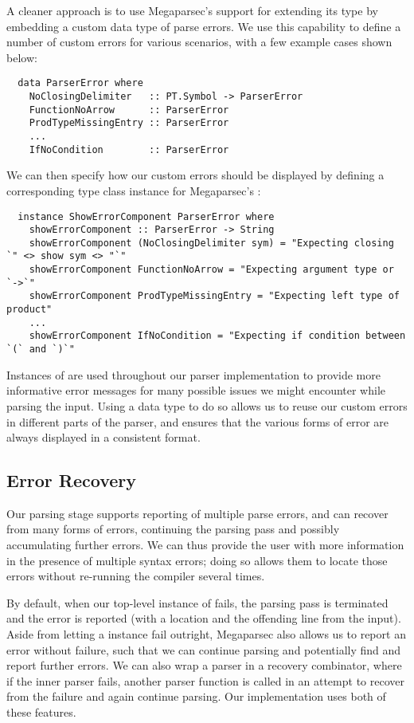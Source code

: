 A cleaner approach is to use Megaparsec's support for extending its
 type by embedding a custom data type of parse errors.
We use this capability to define a number of custom errors for various scenarios,
with a few example cases shown below:
%
\begin{verbatim}
  data ParserError where
    NoClosingDelimiter   :: PT.Symbol -> ParserError
    FunctionNoArrow      :: ParserError
    ProdTypeMissingEntry :: ParserError
    ...
    IfNoCondition        :: ParserError
\end{verbatim}

We can then specify how our custom errors should be displayed by defining a
corresponding type class instance for Megaparsec's :
%
\begin{verbatim}
  instance ShowErrorComponent ParserError where
    showErrorComponent :: ParserError -> String
    showErrorComponent (NoClosingDelimiter sym) = "Expecting closing `" <> show sym <> "`"
    showErrorComponent FunctionNoArrow = "Expecting argument type or `->`"
    showErrorComponent ProdTypeMissingEntry = "Expecting left type of product"
    ...
    showErrorComponent IfNoCondition = "Expecting if condition between `(` and `)`"
\end{verbatim}

Instances of  are used throughout our parser implementation
to provide more informative error messages for many possible issues we might
encounter while parsing the input.
Using a data type to do so allows us to reuse our custom errors in different
parts of the parser, and ensures that the various forms of error are always
displayed in a consistent format.


\subsection{Error Recovery}

Our parsing stage supports reporting of multiple parse errors, and can recover
from many forms of errors, continuing the parsing pass and possibly accumulating
further errors.
We can thus provide the user with more information in the presence of multiple
syntax errors; doing so allows them to locate those errors without re-running
the compiler several times.

By default, when our top-level instance of  fails, the
parsing pass is terminated and the error is reported (with a location and the
offending line from the input).
Aside from letting a  instance fail outright, Megaparsec
also allows us to report an error without failure, such that we can continue
parsing and potentially find and report further errors.
We can also wrap a parser in a recovery combinator, where if the inner parser
fails, another parser function is called in an attempt to recover from the
failure and again continue parsing.
Our implementation uses both of these features.

